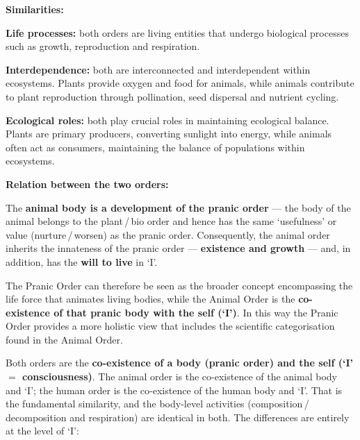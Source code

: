 \textbf{Similarities:}
\begin{apts}
\item \textbf{Life processes:} both orders are living entities that undergo
      biological processes such as growth, reproduction and respiration.
\item \textbf{Interdependence:} both are interconnected and interdependent
      within ecosystems. Plants provide oxygen and food for animals, while
      animals contribute to plant reproduction through pollination, seed
      dispersal and nutrient cycling.
\item \textbf{Ecological roles:} both play crucial roles in maintaining
      ecological balance. Plants are primary producers, converting sunlight
      into energy, while animals often act as consumers, maintaining the
      balance of populations within ecosystems.
\end{apts}

\textbf{Relation between the two orders:}
\begin{apts}
\item The \textbf{animal body is a development of the pranic order} --- the
      body of the animal belongs to the plant\,/\,bio order and hence has the
      same `usefulness' or value (nurture\,/\,worsen) as the pranic order.
      Consequently, the animal order inherits the innateness of the pranic
      order --- \textbf{existence and growth} --- and, in addition, has the
      \textbf{will to live} in `I'.
\item The Pranic Order can therefore be seen as the broader concept
      encompassing the life force that animates living bodies, while the
      Animal Order is the \textbf{co-existence of that pranic body with the
      self (`I')}. In this way the Pranic Order provides a more holistic view
      that includes the scientific categorisation found in the Animal Order.
\end{apts}


\ans Both orders are the \textbf{co-existence of a body (pranic order) and the
self (`I' $=$ consciousness)}. The animal order is the co-existence of the
animal body and `I'; the human order is the co-existence of the human body and
`I'. That is the fundamental similarity, and the body-level activities
(composition\,/\,decomposition and respiration) are identical in both. The
differences are entirely at the level of `I':

